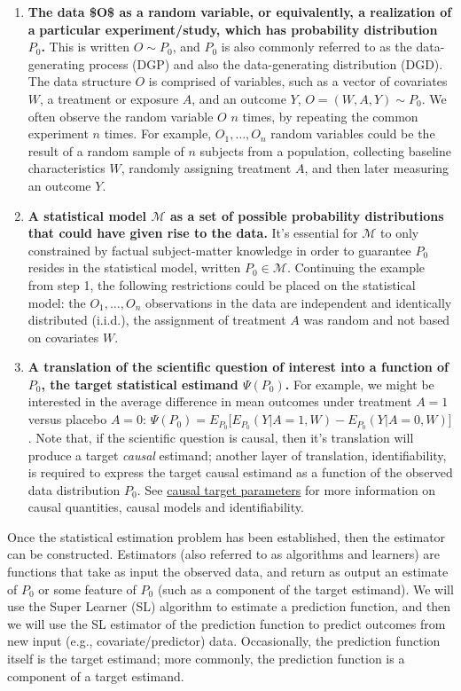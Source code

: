 \documentclass[
  12pt, krantz2,
]{krantz}
\providecommand{\tightlist}{%
  \setlength{\itemsep}{0pt}\setlength{\parskip}{0pt}}
\theoremstyle{definition}
\theoremstyle{definition}
\theoremstyle{definition}
\newcommand{\M}{\mathcal{M}}
\newcommand{\1}{\mathbbm{1}}
\begin{document}
\begin{enumerate}
\def\labelenumi{\arabic{enumi}.}
\tightlist
\item
  \textbf{The data \$O\$ as a random variable, or equivalently, a realization of a}
  \textbf{particular experiment/study, which has probability distribution \(P_0\).}
  This is written \(O \sim P_0\), and \(P_0\) is also commonly referred to as the
  data-generating process (DGP) and also the data-generating distribution
  (DGD). The data structure \(O\) is comprised of variables, such as a
  vector of covariates \(W\), a treatment or exposure \(A\), and an outcome \(Y\),
  \(O=(W,A,Y) \sim P_0\). We often observe the random variable \(O\) \(n\) times, by
  repeating the common experiment \(n\) times. For example, \(O_1,\ldots, O_n\)
  random variables could be the result of a random sample of \(n\) subjects from
  a population, collecting baseline characteristics \(W\), randomly assigning
  treatment \(A\), and then later measuring an outcome \(Y\).
\item
  \textbf{A statistical model \(\M\) as a set of possible probability distributions}
  \textbf{that could have given rise to the data.} It's essential for \(\M\) to only
  constrained by factual subject-matter knowledge in order to guarantee \(P_0\)
  resides in the statistical model, written \(P_0 \in \M\). Continuing
  the example from step 1, the following restrictions could be placed on the
  statistical model: the \(O_1, \ldots, O_n\) observations in the data are
  independent and identically distributed (i.i.d.), the assignment of
  treatment \(A\) was random and not based on covariates \(W\).
\item
  \textbf{A translation of the scientific question of interest into a function of}
  \textbf{\(P_0\), the target statistical estimand \(\Psi(P_0)\).} For example, we might
  be interested in the average difference in mean outcomes under treatment
  \(A=1\) versus placebo \(A=0\):
  \(\Psi(P_0)=E_{P_0}\Big[E_{P_0}(Y|A=1,W)−E_{P_0}(Y|A=0,W)\Big]\). Note
  that, if the scientific question is causal, then it's translation will
  produce a target \emph{causal} estimand; another layer of translation,
  identifiability, is required to express the target causal estimand as a
  function of the observed data distribution \(P_0\). See \protect\hyperlink{causal}{causal target
  parameters} for more information on causal quantities, causal models
  and identifiability.
\end{enumerate}

Once the statistical estimation problem has been established, then the estimator
can be constructed. Estimators (also referred to as algorithms and learners)
are functions that take as input the observed data, and return as output an
estimate of \(P_0\) or some feature of \(P_0\) (such as a component of the target
estimand). We will use the Super Learner (SL) algorithm to estimate a
prediction function, and then we will use the SL estimator of the prediction
function to predict outcomes from new input (e.g., covariate/predictor) data.
Occasionally, the prediction function itself is the target estimand; more
commonly, the prediction function is a component of a target estimand.
\end{document}
